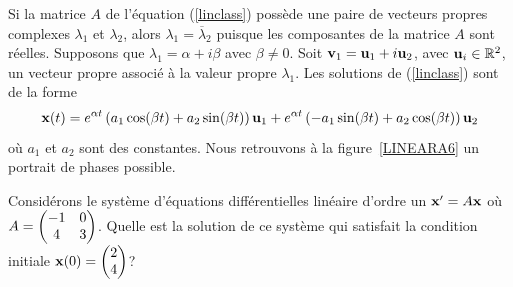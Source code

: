 {\begin{prop} \label{COLsolution}
Si la matrice $A$ de l'équation (\ref{linclass}) possède une paire de
vecteurs propres complexes $\lambda_1$ et $\lambda_2$, alors
$\lambda_1 = \overline{\lambda}_2$ puisque les composantes de la
matrice $A$ sont réelles.  Supposons que $\lambda_1 = \alpha + i\beta$
avec $\beta \neq 0$.  Soit $\mathbf{v}_1 = \mathbf{u}_1 + i \mathbf{u}_2$, avec
$\mathbf{u}_i \in \mathbb{R}^2$, un vecteur propre associé à la valeur propre
$\lambda_1$.  Les solutions de (\ref{linclass}) sont de la forme
\[
\mathbf{x}(t)= e^{\alpha t} \left( a_1 \cos(\beta t) + a_2 \sin(\beta t) \right)
\mathbf{u}_1 + e^{\alpha t} \left( -a_1 \sin(\beta t) + a_2 \cos(\beta t) \right)
\mathbf{u}_2
\]
où $a_1$ et $a_2$ sont des constantes.  Nous retrouvons à la
figure~\ref{LINEARA6} un portrait de phases possible.
\end{prop}


\begin{egg}
Considérons le système d'équations différentielles linéaire d'ordre un
$\mathbf{x}' = A\mathbf{x}$ où
$\displaystyle A = \begin{pmatrix} -1 & 0 \\ 4 & 3 \end{pmatrix}$.
Quelle est la solution de ce système qui satisfait la
condition initiale
$\displaystyle \mathbf{x}(0) = \begin{pmatrix} 2 \\ 4 \end{pmatrix}$?


\end{egg}}
